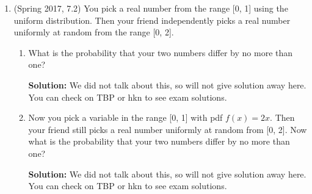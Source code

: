 \documentclass{article}
\newenvironment{solution}{

            \color{blue} \smallskip \textbf{Solution:}}{}
\begin{document}
\begin{enumerate}
\begin{enumerate}
\begin{solution}
                This question is phrased weirdly. We are flipping a coin to decide between $X$ and $Y$, and then sampling from whichever distribution we picked. The value we sampled is $z = 0.6$, and so long as the pdf is different at $0.6$ between $X$ and $Y$, that means
                that actually tells us information about which distribution it came from. We use the law of total probability: \[
                    P(\text{coin picked } X \mid z = 0.6) = \frac{P(\text{coin picked } X \cap z = 0.6)}{P(\text{coin picked } X \cap z = 0.6) + P(\text{coin picked } Y \cap z = 0.6)}
                \]
                Each of these events are now just evaluating the normal distribution PDF! All have a factor of $\frac{1}{\sqrt{2 pi}}$, so I exclude that to stay sane. So we get \[
                    P(\text{coin picked } X \mid z = 0.6) = \frac{e^{-0.6^2/2}}{e^{-0.6^2/2} + e^{-0.4^2/2}}
                \]
            \end{solution}
            \item Should you decide $z$ is from $X$ or from $Y$ to get a larger probability of being right?
            \begin{solution}
                We're thinking in a very Bayesian way here. If we had no information about the sample, the probability the coin flip picked $X$ or $Y$ is exactly 1/2. But knowing the sample gives us some information about which one. Because \[
                    P(\text{coin picked } X \mid z = 0.6) = 1 - P(\text{coin picked } Y \mid z = 0.6)
                \]
                we should only guess $X$ if $P(\text{coin picked } X \mid z = 0.6) > 0.5$. But $e^{-0.6^2/2} < e^{-0.4^2/2}$, meaning that this probability is less than $0.5$, so we should guess $Y$ instead.
            \end{solution}
        \end{enumerate}
        \item (Spring 2017, 7.2) You pick a real number from the range [0, 1] using the uniform distribution. Then your friend independently picks a real number uniformly at random from the range [0, 2].
        \begin{enumerate}
            \item What is the probability that your two numbers differ by no more than one?
            \begin{solution}
                We did not talk about this, so will not give solution away here. You can check on TBP or hkn to see exam solutions.
            \end{solution}
            \item Now you pick a variable in the range [0, 1] with pdf $f(x) = 2x$. Then your friend still picks a real number uniformly at random from [0, 2]. Now what is the probability that your two numbers differ by no more than one?
            \begin{solution}
                We did not talk about this, so will not give solution away here. You can check on TBP or hkn to see exam solutions.
            \end{solution}
        \end{enumerate}
     \end{enumerate}
    
\end{document}
